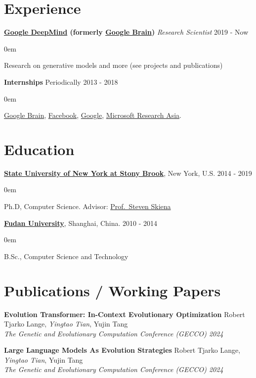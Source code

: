 \documentclass[line,margin]{cv}
\makeatletter
\newenvironment{block}
{
  \begin{addmargin}[2em]{0em}%
}
{
  \end{addmargin}
}
\newcommand{\SUNY}{\href{http://www.stonybrook.edu/}{State University of New York at Stony Brook}}
\newcommand{\Google}{\href{https://www.google.com/}{Google}}
\newcommand{\GoogleBrain}{\href{http://research.google.com/teams/brain/}{Google Brain}}
\newcommand{\GoogleDeepMind}{\href{https://www.deepmind.com/}{Google DeepMind}}
\newcommand{\Facebook}{\href{https://www.facebook.com/}{Facebook}}
\newcommand{\Fudan}{\href{http://www.fudan.edu.cn/englishnew/}{Fudan University}}
\newcommand{\MyMail}{\href{mailto:alan.yt.tian@gmail.com}{alan.yt.tian@gmail.com}}
\newcommand{\MSRA}{\href{http://research.microsoft.com/en-us/labs/asia/default.aspx}{Microsoft Research Asia}}
\newcommand{\Skiena}{\href{https://www3.cs.stonybrook.edu/~skiena/}{Prof.\ Steven Skiena}}
\makeatother
\begin{document}

\address{\textit{E-mail:} \MyMail}

\begin{resume}

\section{Experience}

  {\bf \GoogleDeepMind{} (formerly \GoogleBrain)} {\itshape Research Scientist} \hfill 2019 - Now
  \begin{block}
    Research on generative models and more (see projects and publications)
  \end{block}

  {\bf Internships} \hfill Periodically 2013 - 2018
  \begin{block}
    \GoogleBrain{},  \Facebook{}, \Google{}, \MSRA{}.
  \end{block}

\section{Education}

  {\bf \SUNY}, New York, U.S. \hfill 2014 - 2019
  \begin{block}
    Ph.D, Computer Science. Advisor: \Skiena
  \end{block}

  {\bf \Fudan}, Shanghai, China. \hfill 2010 - 2014

  \begin{block}
    B.Sc., Computer Science and Technology 
  \end{block}



\section{Publications / Working Papers}

  {\bf Evolution Transformer: In-Context Evolutionary Optimization}
  Robert Tjarko Lange, \emph{Yingtao Tian}, Yujin Tang\\
  \emph{The Genetic and Evolutionary Computation Conference (GECCO) 2024}
  
  {\bf Large Language Models As Evolution Strategies}
  Robert Tjarko Lange, \emph{Yingtao Tian}, Yujin Tang\\
  \emph{The Genetic and Evolutionary Computation Conference (GECCO) 2024}
  

\end{resume}
\end{document}
